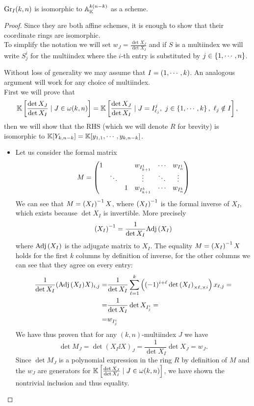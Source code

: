 \begin{proposition}\label{GrassmannianIsCoveredByAffineSpaces}
$\mathrm{Gr}_I(k,n)$ is isomorphic to $\mathbb{A}^{k(n-k)}_{\mathbb{K}}$ as a scheme.
\end{proposition}
\begin{proof}
Since they are both affine schemes, it is enough to show that their coordinate rings are isomorphic.\\
To simplify the notation we will set $w_J=\frac{\det X_J}{\det X_I}$ and if $S$ is a multiindex we will write $S^i_j$ for the multiindex where the $i$-th entry is substituted by $j\in\left\{{1,\cdots, n}\right\}$.
\medskip

\noindent Without loss of generality we may assume that $I=\left({1,\cdots, k}\right)$. An analogous argument will work for any choice of multiindex.\\
First we will prove that
\[\mathbb{K}\left[{\frac{\det X_J}{\det X_I}\mid J\in \omega(k,n)}\right]=\mathbb{K}\left[{\frac{\det X_J}{\det X_I}\mid J=I^j_{\ell_j},\ j\in \left\{{1,\cdots, k}\right\},\ \ell_j\notin I}\right],\]
then we will show that the RHS (which we will denote $R$ for brevity) is isomorphic to $\mathbb{K}[Y_{k,n-k}]=\mathbb{K}[y_{1,1},\cdots, y_{k,n-k}]$.
\setlength{\leftmargini}{0cm}
\begin{itemize}
\item Let us consider the formal matrix
\[M=\begin{pmatrix}
1 &        &   & w_{I^1_{k+1}} & \cdots & w_{I^1_n}\\
  & \ddots &   & \vdots        & \ddots & \vdots\\
  &        & 1 & w_{I^k_{k+1}} & \cdots & w_{I^k_n}
\end{pmatrix}\]
We can see that $M=\left({X_I}\right)^{-1} X$, where $\left({X_I}\right)^{-1}$ is the formal inverse of $X_I$, which exists because $\det X_I$ is invertible. More precisely
\[\left({X_I}\right)^{-1}=\frac1{\det X_I}\mathrm{Adj}\,(X_I)\]
where $\mathrm{Adj}\,(X_I)$ is the adjugate matrix to $X_I$. The equality $M=\left({X_I}\right)^{-1} X$ holds for the first $k$ columns by definition of inverse, for the other columns we can see that they agree on every entry:
\begin{align*}
\frac1{\det X_I}(\mathrm{Adj}\,(X_I) X)_{i,j}=&\frac1{\det X_I}\sum_{\ell=1}^k\left({(-1)^{i+\ell} \det \left({X_I}\right)_{\times \ell,\times i}}\right)x_{\ell,j}=\\
=&\frac1{\det X_I}\det X_{I^i_j}=\\
=&w_{I^i_j}
\end{align*}
We have thus proven that for any $(k,n)$-multiindex $J$ we have
\[\det M_J=\det (X_I\ii X)_J=\frac1{\det X_I}\det X_J=w_J.\]
Since $\det M_J$ is a polynomial expression in the ring $R$ by definition of $M$ and the $w_J$ are generators for $\mathbb{K}\left[{\frac{\det X_J}{\det X_I}\mid J\in \omega(k,n)}\right]$, we have shown the nontrivial inclusion and thus equality.

\end{itemize}
\end{proof}
